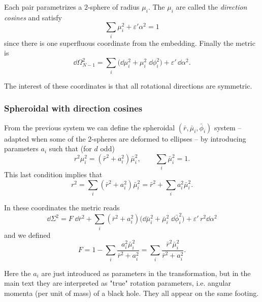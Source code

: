 Each pair parametrizes a $2$-sphere of radius $\mu_i$.
The $\mu_i$ are called the \emph{direction cosines} and satisfy
\begin{equation}
	\sum_i \mu_i^2 + \varepsilon' \alpha^2 = 1
\end{equation} 
since there is one superfluous coordinate from the embedding.
Finally the metric is
\begin{equation}
	\dd \Omega_{N-1}^2 = \sum_i \Big(\dd \mu_i^2 + \mu_i^2\; \dd \phi_i^2 \Big) + \varepsilon'\, \dd \alpha^2.
\end{equation} 

The interest of these coordinates is that all rotational directions are symmetric.


\subsubsection{Spheroidal with direction cosines}
\label{app:coord:general-d:oblate-cosines}

From the previous system we can define the spheroidal $(\bar r, \bar\mu_i, \bar\phi_i)$ system – adapted when some of the $2$-spheres are deformed to ellipses – by introducing parameters $a_i$ such that (for $d$ odd)
\begin{equation}
	\label{coord:eq:spherical-to-oblate-mu}
	r^2 \mu_i^2 = (\bar r^2 + a_i^2) \bar \mu_i^2, \qquad
	\sum_i \bar \mu_i^2 = 1.
\end{equation} 
This last condition implies that
\begin{equation}
	r^2 = \sum_i (\bar r^2 + a_i^2) \bar \mu_i^2
		= \bar r^2 + \sum_i a_i^2 \bar \mu_i^2.
\end{equation} 

In these coordinates the metric reads
\begin{equation}
	\label{coord:metric:flat-d:spheroidal}
	\dd \Sigma^2 = F\; \dd \bar r^2 + \sum_i (\bar r^2 + a_i^2) \Big(\dd \bar \mu_i^2 + \bar \mu_i^2\; \dd \bar \phi_i^2 \Big) + \varepsilon'\, r^2 \dd \alpha^2
\end{equation} 
and we defined
\begin{equation}
	\label{coord:eq:flat-d:spheroidal:F}
	F = 1 - \sum_i \frac{a_i^2 \bar \mu_i^2}{\bar r^2 + a_i^2} = \sum_i \frac{\bar r^2 \bar \mu_i^2}{\bar r^2 + a_i^2}.
\end{equation} 

Here the $a_i$ are just introduced as parameters in the transformation, but in the main text they are interpreted as "true" rotation parameters, i.e.
angular momenta (per unit of mass) of a black hole.
They all appear on the same footing.

